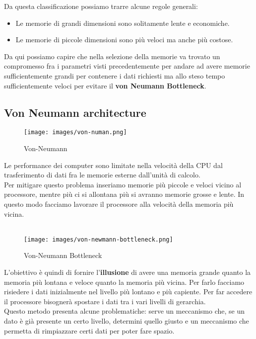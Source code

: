 \hspace{-15pt}Da questa classificazione possiamo trarre alcune regole generali:
\begin{itemize}
    \item Le memorie di grandi dimensioni sono solitamente lente e economiche.
    \item Le memorie di piccole dimensioni sono più veloci ma anche più costose.
\end{itemize}

\noindent Da qui possiamo capire che nella selezione della memorie va trovato un compromesso fra i parametri visti precedentemente per andare ad avere memorie sufficientemente grandi per contenere i dati richiesti ma allo steso tempo sufficientemente veloci per evitare il \textbf{von Neumann Bottleneck}.

\newpage
\subsection{Von Neumann architecture}
\begin{wrapfigure}{r}{6.5cm}
    \vspace{-25pt}
    \centering
    \texttt{[image: images/von-numan.png]}
    \caption{Von-Neumann}
\end{wrapfigure}
Le performance dei computer sono limitate nella velocità della CPU dal trasferimento di dati fra le memorie esterne dall'unità di calcolo.\\
Per mitigare questo problema inseriamo memorie più piccole e veloci vicino al processore, mentre più ci si allontana più si avranno memorie grosse e lente. In questo modo facciamo lavorare il processore alla velocità della memoria più vicina.\\\\

\begin{wrapfigure}{l}{6.5cm}
    \vspace{-10pt}
    \centering
    \texttt{[image: images/von-newmann-bottleneck.png]}
    \caption{Von-Neumann Bottleneck}
\end{wrapfigure}
L'obiettivo è quindi di fornire l'\textbf{illusione} di avere una memoria grande quanto la memoria più lontana e veloce quanto la memoria più vicina.
Per farlo facciamo risiedere i dati inizialmente nel livello più lontano e più capiente. Per far accedere il processore bisognerà spostare i dati tra i vari livelli di gerarchia.\\
Questo metodo presenta alcune problematiche: serve un meccanismo che, se un dato è già presente un certo livello, determini quello giusto e un meccanismo che permetta di rimpiazzare certi dati per poter fare spazio.\\


